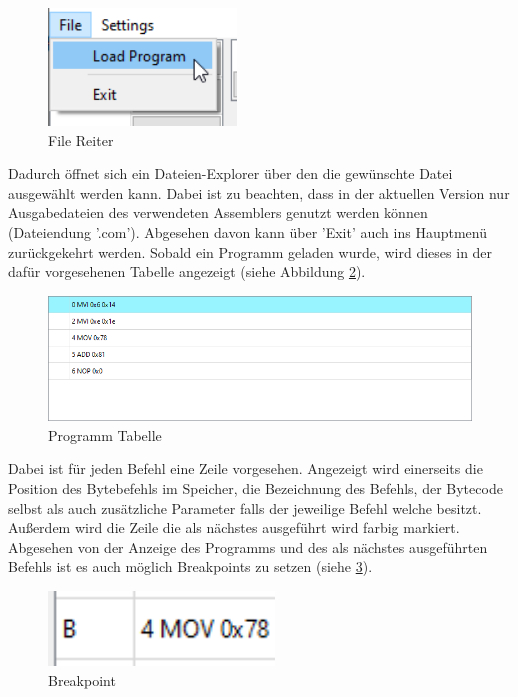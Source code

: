 \documentclass[12pt]{article}
\newcommand{\imgSpaceBefore}{\vspace{10pt}}
\begin{document}
\begin{figure}[H]
\centering
\includegraphics[width=5cm]{bilder/LoadFile}
\caption{File Reiter}
\label{fig:LoadFile}
\end{figure}

\noindent
Dadurch öffnet sich ein Dateien-Explorer über den die gewünschte Datei ausgewählt werden kann. Dabei ist zu beachten, dass in der aktuellen Version nur Ausgabedateien des verwendeten Assemblers genutzt werden können (Dateiendung '.com'). Abgesehen davon kann über 'Exit' auch ins Hauptmenü zurückgekehrt werden. Sobald ein Programm geladen wurde, wird dieses in der dafür vorgesehenen Tabelle angezeigt (siehe Abbildung \ref{fig:ProgTable}).\imgSpaceBefore

\begin{figure}[H]
\centering
\includegraphics[width=15cm]{bilder/Program_table}
\caption{Programm Tabelle}
\label{fig:ProgTable}
\end{figure}

\noindent
Dabei ist für jeden Befehl eine Zeile vorgesehen. Angezeigt wird einerseits die Position des Bytebefehls im Speicher, die Bezeichnung des Befehls, der Bytecode selbst als auch zusätzliche Parameter falls der jeweilige Befehl welche besitzt. Außerdem wird die Zeile die als nächstes ausgeführt wird farbig markiert. Abgesehen von der Anzeige des Programms und des als nächstes ausgeführten Befehls ist es auch möglich Breakpoints zu setzen (siehe \ref{fig:Break}).\imgSpaceBefore

\begin{figure}[h]
\centering
\includegraphics[width=6cm]{bilder/Breakpoint}
\caption{Breakpoint}
\label{fig:Break}
\end{figure}
\end{document}
